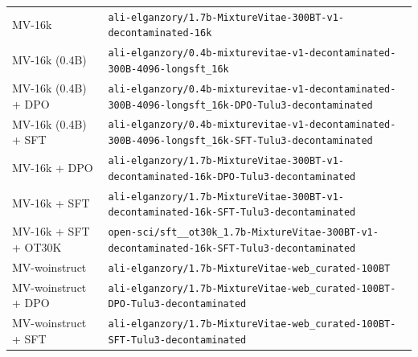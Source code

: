 \begin{table}[ht]
\begin{tabular}{lp{10cm}}
MV-16k & \texttt{ali-\allowbreak{}elganzory/\allowbreak{}1.7b-\allowbreak{}MixtureVitae-\allowbreak{}300BT-\allowbreak{}v1-\allowbreak{}decontaminated-\allowbreak{}16k} \\
MV-16k (0.4B) & \texttt{ali-\allowbreak{}elganzory/\allowbreak{}0.4b-\allowbreak{}mixturevitae-\allowbreak{}v1-\allowbreak{}decontaminated-\allowbreak{}300B-\allowbreak{}4096-\allowbreak{}longsft\_16k} \\
MV-16k (0.4B) + DPO & \texttt{ali-\allowbreak{}elganzory/\allowbreak{}0.4b-\allowbreak{}mixturevitae-\allowbreak{}v1-\allowbreak{}decontaminated-\allowbreak{}300B-\allowbreak{}4096-\allowbreak{}longsft\_16k-\allowbreak{}DPO-\allowbreak{}Tulu3-\allowbreak{}decontaminated} \\
MV-16k (0.4B) + SFT & \texttt{ali-\allowbreak{}elganzory/\allowbreak{}0.4b-\allowbreak{}mixturevitae-\allowbreak{}v1-\allowbreak{}decontaminated-\allowbreak{}300B-\allowbreak{}4096-\allowbreak{}longsft\_16k-\allowbreak{}SFT-\allowbreak{}Tulu3-\allowbreak{}decontaminated} \\
MV-16k + DPO & \texttt{ali-\allowbreak{}elganzory/\allowbreak{}1.7b-\allowbreak{}MixtureVitae-\allowbreak{}300BT-\allowbreak{}v1-\allowbreak{}decontaminated-\allowbreak{}16k-\allowbreak{}DPO-\allowbreak{}Tulu3-\allowbreak{}decontaminated} \\
MV-16k + SFT & \texttt{ali-\allowbreak{}elganzory/\allowbreak{}1.7b-\allowbreak{}MixtureVitae-\allowbreak{}300BT-\allowbreak{}v1-\allowbreak{}decontaminated-\allowbreak{}16k-\allowbreak{}SFT-\allowbreak{}Tulu3-\allowbreak{}decontaminated} \\
MV-16k + SFT + OT30K & \texttt{open-\allowbreak{}sci/\allowbreak{}sft\_\_ot30k\_1.7b-\allowbreak{}MixtureVitae-\allowbreak{}300BT-\allowbreak{}v1-\allowbreak{}decontaminated-\allowbreak{}16k-\allowbreak{}SFT-\allowbreak{}Tulu3-\allowbreak{}decontaminated} \\
MV-woinstruct & \texttt{ali-\allowbreak{}elganzory/\allowbreak{}1.7b-\allowbreak{}MixtureVitae-\allowbreak{}web\_curated-\allowbreak{}100BT} \\
MV-woinstruct + DPO & \texttt{ali-\allowbreak{}elganzory/\allowbreak{}1.7b-\allowbreak{}MixtureVitae-\allowbreak{}web\_curated-\allowbreak{}100BT-\allowbreak{}DPO-\allowbreak{}Tulu3-\allowbreak{}decontaminated} \\
MV-woinstruct + SFT & \texttt{ali-\allowbreak{}elganzory/\allowbreak{}1.7b-\allowbreak{}MixtureVitae-\allowbreak{}web\_curated-\allowbreak{}100BT-\allowbreak{}SFT-\allowbreak{}Tulu3-\allowbreak{}decontaminated} \\

\end{tabular}
\end{table}
